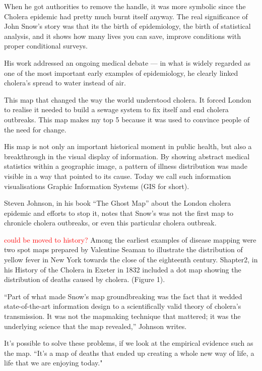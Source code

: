 \documentclass[12pt]{article}
\newcommand\todo[1]{\textcolor{red}{#1}}
\begin{document}
When he got authorities to remove the handle, it was more symbolic since the Cholera epidemic had pretty much burnt itself anyway. The real significance of John Snow's story was that its the birth of epidemiology, the birth of statistical analysis, and it shows how many lives you can save, improve conditions with proper conditional surveys. \cite{youtube}

His work addressed an ongoing medical debate — in what is widely regarded as one of the most important early examples of epidemiology, he clearly linked cholera’s spread to water instead of air. \cite{blog}

This map that changed the way the world understood cholera. It forced London to realise it needed to build a sewage system to fix itself and end cholera outbreaks. This map makes my top 5 because it was used to convince people of the need for change. \cite{top5}

His map is not only an important historical moment in public health, but also a breakthrough in the visual display of information. By showing abstract medical statistics within a geographic image, a pattern of illness distribution was made visible in a way that pointed to its cause. Today we call such information visualisations Graphic Information Systems (GIS for short). \cite{test}

Steven Johnson, in his book “The Ghost Map” about the London cholera epidemic and efforts to stop it, notes that Snow’s was not the first map to chronicle cholera outbreaks, or even this particular cholera outbreak. \cite{history}

\todo{could be moved to history?}
Among the earliest examples of disease mapping were
two spot maps prepared by Valentine Seaman to illustrate
the distribution of yellow fever in New York
towards the close of the eighteenth century. Shapter2, in
his History of the Cholera in Exeter in 1832 included a dot
map showing the distribution of deaths caused by
cholera. (Figure 1). \cite{howe1970some}

“Part of what made Snow’s map groundbreaking was the fact that it wedded state-of-the-art information design to a scientifically valid theory of cholera’s transmission. It was not the mapmaking technique that mattered; it was the underlying science that the map revealed,” Johnson writes. \cite{history}

It's possible to solve these problems, if we look at the empirical evidence such as the map. ``It's a  map of deaths that ended up creating a whole new way of life, a life that we are enjoying today." \cite{tedtalk}
\end{document}
